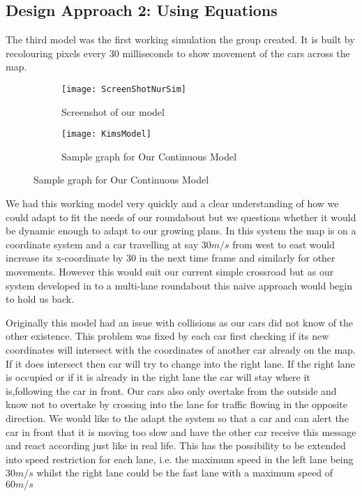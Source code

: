 \documentclass[11pt]{article}
\begin{document}
	
	\subsection{Design Approach 2: Using Equations}
	
    The third model was the first working simulation the group created. It is built by recolouring pixels every 30 milliseconds to show movement of the cars across the map. 
	
%		

\FloatBarrier
	\begin{figure}
	
		\centering
		\begin{subfigure}{.4\textwidth}
			\centering
		\texttt{[image: ScreenShotNurSim]}
		\caption{Screenshot of  our model }
		\end{subfigure}
		\begin{subfigure}{.5\textwidth}
			\centering
			\texttt{[image: KimsModel]}
			\caption{Sample graph for Our Continuous Model}
			\end{subfigure}
	\end{figure}
	
	We had this working model very quickly and a clear understanding of how we could adapt to fit the needs of our roundabout but we questions whether it would be dynamic enough to adapt to our growing plans. In this system the map is on a coordinate system and a car travelling at say $30 m/s$ from west to east would increase its x-coordinate by 30 in the next time frame and similarly for other movements. However this would suit our current simple crossroad but as our system developed in to a multi-lane roundabout this naive approach would begin to hold us back.
	
	Originally this model had an issue with collisions as our cars did not know of the other existence. This problem was fixed by each car first checking if its new coordinates will intersect with the coordinates of another car already on the map. If it does intersect then car will try to change into the right lane. If the right lane is occupied or if it is already in the right lane the car will stay where it is,following the car in front. Our cars also only overtake from the outside and know not to overtake by crossing into the lane for traffic flowing in the opposite direction. We would like to the adapt the system so that a car and can alert the car in front that it is moving too slow and have the other car receive this message and react according just like in real life. This has the possibility to be extended into speed restriction for each lane, i.e. the maximum speed in the left lane being $30m/s$ whilst the right lane could be the fast lane with a maximum speed of $60m/s$
	
\end{document}
